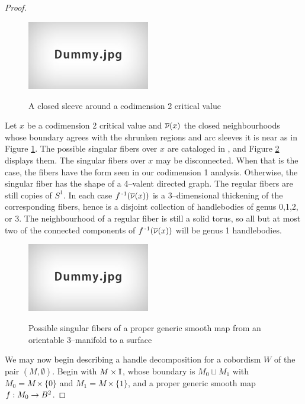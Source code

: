 \begin{proof}
	\begin{figure}
		\centering
		\caption{A closed sleeve around a codimension 2 critical value}
		\includegraphics[height=3cm]{figures/dummy.jpg}
		\label{fig:isolatesleeve}
	\end{figure}
	
	Let $x$ be a codimension 2 critical value and $\overline{\nu}(x)$ the closed neighbourhoods whose boundary agrees with the shrunken regions and arc sleeves it is near as in Figure \ref{fig:isolatesleeve}.
	The possible singular fibers over $x$ are cataloged in \cite{Saeki}, and Figure \ref{fig:saekising} displays them.
	The singular fibers over $x$ may be disconnected.
	When that is the case, the fibers have the form seen in our codimension 1 analysis.
	Otherwise, the singular fiber has the shape of a 4--valent directed graph.
	The regular fibers are still copies of $S^1$.
	In each case $f^{\,\text{-}1}(\overline{\nu}(x))$ is a 3--dimensional thickening of the corresponding fibers, hence is a disjoint collection of handlebodies of genus 0,1,2, or 3.
	The neighbourhood of a regular fiber is still a solid torus, so all but at most two of the connected components of $f^{\,\text{-}1}(\overline{\nu}(x))$ will be genus 1 handlebodies.
	
	\begin{figure}
		\centering
		\captionsetup{justification=centering}
		\caption{Possible singular fibers of a proper generic smooth map from an orientable 3--manifold to a surface}
		\includegraphics[height=3cm]{figures/dummy.jpg}
		\label{fig:saekising}
	\end{figure}
	
	We may now begin describing a handle decomposition for a cobordism $W$ of the pair $(M,\emptyset)$.
	Begin with $M\times\mathbb{I}$, whose boundary is $M_0\sqcup M_1$ with $M_0=M\times\{0\}$ and $M_1 = M\times\{1\}$, and a proper generic smooth map $f:M_0\to B^2$.


\end{proof}
